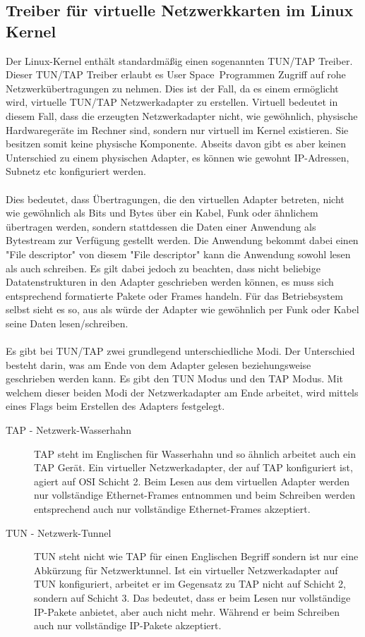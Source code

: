 \subsection{Treiber für virtuelle Netzwerkkarten im Linux Kernel}
Der Linux-Kernel enthält standardmäßig einen sogenannten TUN/TAP Treiber. Dieser TUN/TAP Treiber erlaubt es \dq User Space\dq \ Programmen Zugriff auf rohe Netzwerkübertragungen zu nehmen. Dies ist der Fall, da es einem ermöglicht wird, virtuelle TUN/TAP Netzwerkadapter zu erstellen.
Virtuell bedeutet in diesem Fall, dass die erzeugten Netzwerkadapter nicht, wie gewöhnlich, physische Hardwaregeräte im Rechner sind, sondern nur virtuell im Kernel existieren. Sie besitzen somit keine physische Komponente. Abseits davon gibt es aber keinen Unterschied zu einem physischen Adapter, es können wie gewohnt IP-Adressen, Subnetz etc konfiguriert werden.
\\\\
Dies bedeutet, dass Übertragungen, die den virtuellen Adapter betreten, nicht wie gewöhnlich als Bits und Bytes über ein Kabel, Funk oder ähnlichem übertragen werden, sondern stattdessen die Daten einer Anwendung als Bytestream zur Verfügung gestellt werden. Die Anwendung bekommt dabei einen "File descriptor" von diesem "File descriptor" kann die Anwendung sowohl lesen als auch schreiben. Es gilt dabei jedoch zu beachten, dass nicht beliebige Datatenstrukturen in den Adapter geschrieben werden können, es muss sich entsprechend formatierte Pakete oder Frames handeln. Für das Betriebsystem selbst sieht es so, aus als würde der Adapter wie gewöhnlich per Funk oder Kabel seine Daten lesen/schreiben.
\\\\
Es gibt bei TUN/TAP zwei grundlegend unterschiedliche Modi. Der Unterschied besteht darin, was am Ende von dem Adapter gelesen beziehungsweise geschrieben werden kann. Es gibt den TUN Modus und den TAP Modus. Mit welchem dieser beiden Modi der Netzwerkadapter am Ende arbeitet, wird mittels eines Flags beim Erstellen des Adapters festgelegt.
\\
\begin{description}
    \item[TAP - Netzwerk-Wasserhahn] TAP steht im Englischen für Wasserhahn und so ähnlich arbeitet auch ein TAP Gerät.
    Ein virtueller Netzwerkadapter, der auf TAP konfiguriert ist, agiert auf OSI Schicht 2. 
    Beim Lesen aus dem virtuellen Adapter werden nur vollständige Ethernet-Frames entnommen und beim Schreiben werden entsprechend auch nur vollständige Ethernet-Frames akzeptiert.
    \\
    \item[TUN - Netzwerk-Tunnel] TUN steht nicht wie TAP für einen Englischen Begriff sondern ist nur eine Abkürzung für Netzwerktunnel. 
    Ist ein virtueller Netzwerkadapter auf TUN konfiguriert, arbeitet er im Gegensatz zu TAP nicht auf Schicht 2, sondern auf Schicht 3. Das bedeutet, dass er beim Lesen nur vollständige IP-Pakete anbietet, aber auch nicht mehr. Während er beim Schreiben auch nur vollständige IP-Pakete akzeptiert. 
\end{description}
\

